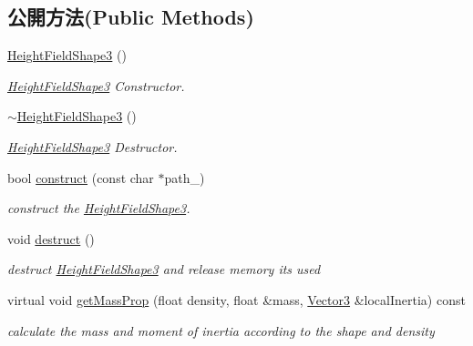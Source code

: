 \subsection*{公開方法(Public Methods)}
\begin{DoxyCompactItemize}
\item 
\hyperlink{class_i_dream_sky_1_1_height_field_shape3_aae970c34abda857433d744a6998af331}{Height\+Field\+Shape3} ()
\begin{DoxyCompactList}\small\item\em \hyperlink{class_i_dream_sky_1_1_height_field_shape3}{Height\+Field\+Shape3} Constructor. \end{DoxyCompactList}\item 
\hyperlink{class_i_dream_sky_1_1_height_field_shape3_a2b06078344cebeafd4c0761a809393c4}{$\sim$\+Height\+Field\+Shape3} ()
\begin{DoxyCompactList}\small\item\em \hyperlink{class_i_dream_sky_1_1_height_field_shape3}{Height\+Field\+Shape3} Destructor. \end{DoxyCompactList}\item 
bool \hyperlink{class_i_dream_sky_1_1_height_field_shape3_a2ef104eadb0ea833564f3d47263c9cb0}{construct} (const char $\ast$path\+\_\+)
\begin{DoxyCompactList}\small\item\em construct the \hyperlink{class_i_dream_sky_1_1_height_field_shape3}{Height\+Field\+Shape3}. \end{DoxyCompactList}\item 
void \hyperlink{class_i_dream_sky_1_1_height_field_shape3_a1d4b629093852f99e61bb98ff2d18df6}{destruct} ()\hypertarget{class_i_dream_sky_1_1_height_field_shape3_a1d4b629093852f99e61bb98ff2d18df6}{}\label{class_i_dream_sky_1_1_height_field_shape3_a1d4b629093852f99e61bb98ff2d18df6}

\begin{DoxyCompactList}\small\item\em destruct \hyperlink{class_i_dream_sky_1_1_height_field_shape3}{Height\+Field\+Shape3} and release memory its used \end{DoxyCompactList}\item 
virtual void \hyperlink{class_i_dream_sky_1_1_height_field_shape3_acc884a1757a1873353c679403939361b}{get\+Mass\+Prop} (float density, float \&mass, \hyperlink{class_i_dream_sky_1_1_vector3}{Vector3} \&local\+Inertia) const 
\begin{DoxyCompactList}\small\item\em calculate the mass and moment of inertia according to the shape and density \end{DoxyCompactList}\end{DoxyCompactItemize}
